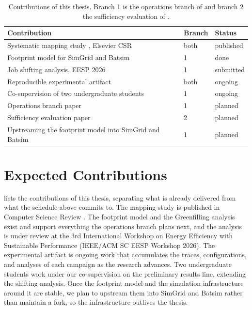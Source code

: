 \begin{table}
\centering
\renewcommand{\arraystretch}{1.2}
\begin{tabularx}{\textwidth}{Xll}
\toprule
\textbf{Contribution} & \textbf{Branch} & \textbf{Status} \\
\midrule
Systematic mapping study \parencite{rosa2026Environmental}, Elsevier CSR & both & published \\
Footprint model for SimGrid and Batsim & 1 & done \\
Job shifting analysis, EESP 2026 & 1 & submitted \\
Reproducible experimental artifact & both & ongoing \\
Co-supervision of two undergraduate students & 1 & ongoing \\
Operations branch paper & 1 & planned \\
Sufficiency evaluation paper & 2 & planned \\
Upstreaming the footprint model into SimGrid and Batsim & 1 & planned \\
\bottomrule
\end{tabularx}
\caption{Contributions of this thesis. Branch 1 is the operations branch of  and branch 2 the sufficiency evaluation of .}
\label{tab:schedule-contributions}
\end{table}

\section{Expected Contributions}
\label{sec:schedule-contributions}

 lists the contributions of this thesis, separating what is already delivered from what the schedule above commits to. The mapping study is published in Computer Science Review \parencite{rosa2026Environmental}. The footprint model and the Greenfilling analysis exist and support everything the operations branch plans next, and the analysis is under review at the 3rd International Workshop on Energy Efficiency with Sustainable Performance (IEEE/ACM SC EESP Workshop 2026). The experimental artifact is ongoing work that accumulates the traces, configurations, and analyses of each campaign as the research advances. Two undergraduate students work under our co-supervision on the preliminary results line, extending the shifting analysis. Once the footprint model and the simulation infrastructure around it are stable, we plan to upstream them into SimGrid and Batsim rather than maintain a fork, so the infrastructure outlives the thesis.

